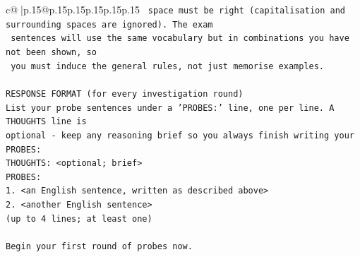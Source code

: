 \documentclass{article}
\begin{document}
{\begin{supertabular}{c@{$\;$}|p{.15\linewidth}@{}p{.15\linewidth}p{.15\linewidth}p{.15\linewidth}p{.15\linewidth}p{.15\linewidth}}
{{{\texttt{   space must be right (capitalisation and surrounding spaces are ignored). The exam} \\
\texttt{   sentences will use the same vocabulary but in combinations you have not been shown, so} \\
\texttt{   you must induce the general rules, not just memorise examples.} \\
\\ 
\texttt{RESPONSE FORMAT (for every investigation round)} \\
\texttt{List your probe sentences under a 'PROBES:' line, one per line. A THOUGHTS line is} \\
\texttt{optional {-} keep any reasoning brief so you always finish writing your PROBES:} \\
\texttt{THOUGHTS: <optional; brief>} \\
\texttt{PROBES:} \\
\texttt{1. <an English sentence, written as described above>} \\
\texttt{2. <another English sentence>} \\
\texttt{(up to 4 lines; at least one)} \\
\\ 
\texttt{Begin your first round of probes now.} \\
            }
        }
    }
     \\ \\


\end{supertabular}}
\end{document}
